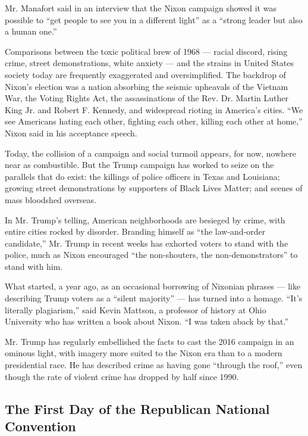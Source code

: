 Mr. Manafort said in an interview that the Nixon campaign showed it was
possible to ``get people to see you in a different light'' as a ``strong
leader but also a human one.''

Comparisons between the toxic political brew of 1968 --- racial discord,
rising crime, street demonstrations, white anxiety --- and the strains
in United States society today are frequently exaggerated and
oversimplified. The backdrop of Nixon's election was a nation absorbing
the seismic upheavals of the Vietnam War, the Voting Rights Act, the
assassinations of the Rev. Dr. Martin Luther King Jr. and Robert F.
Kennedy, and widespread rioting in America's cities. ``We see Americans
hating each other, fighting each other, killing each other at home,''
Nixon said in his acceptance speech.

Today, the collision of a campaign and social turmoil appears, for now,
nowhere near as combustible. But the Trump campaign has worked to seize
on the parallels that do exist: the killings of police officers in Texas
and Louisiana; growing street demonstrations by supporters of Black
Lives Matter; and scenes of mass bloodshed overseas.

In Mr. Trump's telling, American neighborhoods are besieged by crime,
with entire cities rocked by disorder. Branding himself as ``the
law-and-order candidate,'' Mr. Trump in recent weeks has exhorted voters
to stand with the police, much as Nixon encouraged ``the non-shouters,
the non-demonstrators'' to stand with him.

What started, a year ago, as an occasional borrowing of Nixonian phrases
--- like describing Trump voters as a ``silent majority'' --- has turned
into a homage. ``It's literally plagiarism,'' said Kevin Mattson, a
professor of history at Ohio University who has written a book about
Nixon. ``I was taken aback by that.''

Mr. Trump has regularly embellished the facts to cast the 2016 campaign
in an ominous light, with imagery more suited to the Nixon era than to a
modern presidential race. He has described crime as having gone
``through the roof,'' even though the rate of violent crime has dropped
by half since 1990.

\href{https://www.nytimes.com/slideshow/2016/07/18/us/politics/the-first-day-of-the-republican-national-convention.html}{}

\hypertarget{the-first-day-of-the-republican-national-convention}{%
\subsection{The First Day of the Republican National
Convention}\label{the-first-day-of-the-republican-national-convention}}

